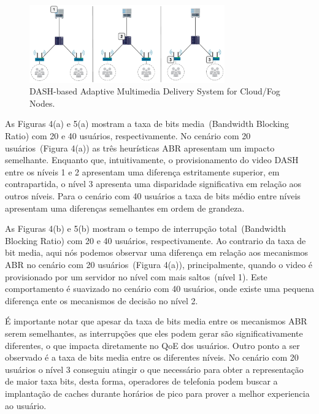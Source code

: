 
\vspace{0.8cm}
\begin{figure}[htpb]
	\centering
	\includegraphics[width=0.75\textwidth]{img/exp-multi-lvl}
	\caption{DASH-based Adaptive Multimedia Delivery System for Cloud/Fog Nodes.}
	\label{fig:scenario-arch}
\end{figure}

As Figuras 4(a) e 5(a) mostram a taxa de bits media~(Bandwidth Blocking Ratio) com 20 e 40 usuários, respectivamente. No cenário com 20 usuários~(Figura 4(a)) as três heurísticas ABR apresentam um impacto semelhante. Enquanto que, intuitivamente, o provisionamento do video DASH entre os níveis 1 e 2 apresentam uma diferença estritamente superior, em contrapartida, o nível 3 apresenta uma disparidade significativa em relação aos outros níveis. Para o cenário com 40 usuários a taxa de bits médio entre níveis apresentam uma diferenças semelhantes em ordem de grandeza. 

As Figuras 4(b) e 5(b) mostram o tempo de interrupção total~(Bandwidth Blocking Ratio) com 20 e 40 usuários, respectivamente. Ao contrario da taxa de bit media, aqui nós podemos observar uma diferença em relação aos mecanismos ABR no cenário com 20 usuários~(Figura 4(a)), principalmente, quando o video é provisionado por um servidor no nível com mais saltos~(nível 1). Este comportamento é suavizado no cenário com 40 usuários, onde existe uma pequena diferença ente os mecanismos de decisão no nível 2.

É importante notar que apesar da taxa de bits media entre os mecanismos ABR serem semelhantes, as interrupções que eles podem gerar são significativamente diferentes, o que impacta diretamente no QoE dos usuários. Outro ponto a ser observado é a taxa de bits media entre os diferentes níveis. No cenário com 20 usuários o nível 3 conseguiu atingir o que necessário para obter a representação de maior taxa bits, desta forma, operadores de telefonia podem buscar a implantação de caches durante horários de pico para prover a melhor experiencia ao usuário.


